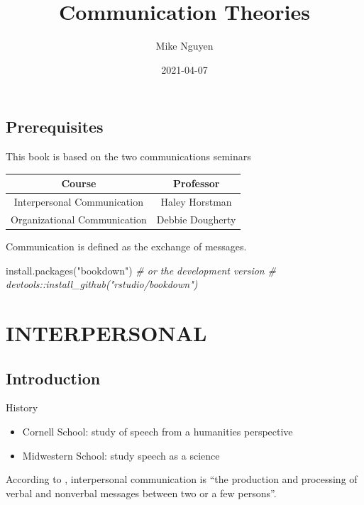 \documentclass[
]{book}
\title{Communication Theories}
\author{Mike Nguyen}
\date{2021-04-07}
\newenvironment{Shaded}{\begin{snugshade}}{\end{snugshade}}
\newcommand{\CommentTok}[1]{\textcolor[rgb]{0.56,0.35,0.01}{\textit{#1}}}
\newcommand{\FunctionTok}[1]{\textcolor[rgb]{0.00,0.00,0.00}{#1}}
\newcommand{\NormalTok}[1]{#1}
\newcommand{\StringTok}[1]{\textcolor[rgb]{0.31,0.60,0.02}{#1}}
\providecommand{\tightlist}{%
  \setlength{\itemsep}{0pt}\setlength{\parskip}{0pt}}
\begin{document}
\maketitle

{
\setcounter{tocdepth}{1}
\tableofcontents
}
\hypertarget{prerequisites}{%
\chapter{Prerequisites}\label{prerequisites}}

This book is based on the two communications seminars

\begin{longtable}[]{@{}cc@{}}
\toprule
Course & Professor\tabularnewline
\midrule
\endhead
Interpersonal Communication & Haley Horstman\tabularnewline
Organizational Communication & Debbie Dougherty\tabularnewline
\bottomrule
\end{longtable}

Communication is defined as the exchange of messages.

\begin{Shaded}
\begin{Highlighting}[]
\FunctionTok{install.packages}\NormalTok{(}\StringTok{"bookdown"}\NormalTok{)}
\CommentTok{\# or the development version}
\CommentTok{\# devtools::install\_github("rstudio/bookdown")}
\end{Highlighting}
\end{Shaded}

\hypertarget{part-interpersonal}{%
\part{INTERPERSONAL}\label{part-interpersonal}}

\hypertarget{intro}{%
\chapter{Introduction}\label{intro}}

History

\begin{itemize}
\tightlist
\item
  Cornell School: study of speech from a humanities perspective
\item
  Midwestern School: study speech as a science
\end{itemize}

According to \citep{Baxter_2008}, interpersonal communication is ``the
production and processing of verbal and nonverbal messages between two
or a few persons''.
\end{document}
